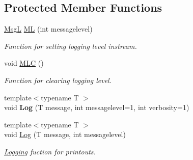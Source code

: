 \subsection*{Protected Member Functions}
\begin{DoxyCompactItemize}
\item 
\hyperlink{structMsgL}{Msg\-L} \hyperlink{classTool_aece350bc23e63656276b8338419dc54e}{M\-L} (int messagelevel)
\begin{DoxyCompactList}\small\item\em Function for setting logging level instream. \end{DoxyCompactList}\item 
\hypertarget{classTool_ae4da557812278419f6f8b8484df08115}{void \hyperlink{classTool_ae4da557812278419f6f8b8484df08115}{M\-L\-C} ()}\label{classTool_ae4da557812278419f6f8b8484df08115}

\begin{DoxyCompactList}\small\item\em Function for clearing logging level. \end{DoxyCompactList}\item 
\hypertarget{classTool_a46f7e599888302feefcf25e4f6cb4f9e}{{\footnotesize template$<$typename T $>$ }\\void {\bfseries Log} (T message, int messagelevel=1, int verbosity=1)}\label{classTool_a46f7e599888302feefcf25e4f6cb4f9e}

\item 
{\footnotesize template$<$typename T $>$ }\\void \hyperlink{classTool_ac65a2dfa2e3531fe8e05fe4112846fcf}{Log} (T message, int messagelevel)
\begin{DoxyCompactList}\small\item\em \hyperlink{classLogging}{Logging} fuction for printouts. \end{DoxyCompactList}\end{DoxyCompactItemize}

